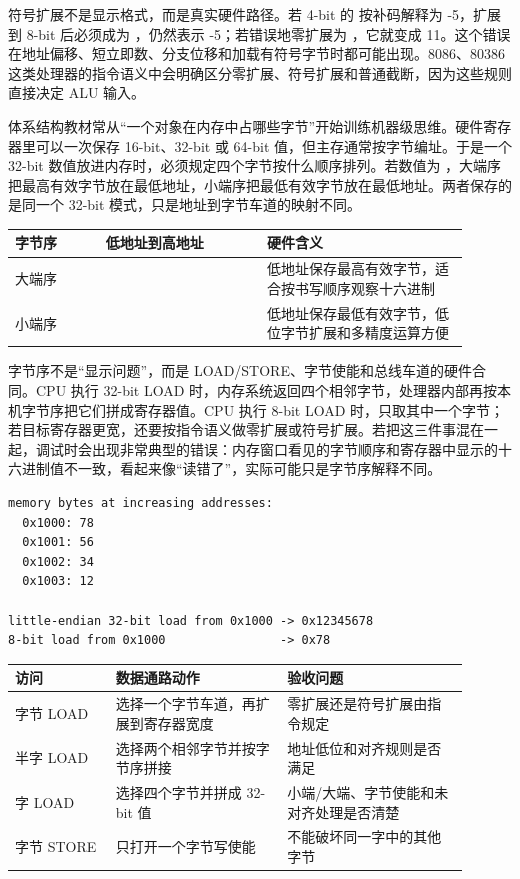 符号扩展不是显示格式，而是真实硬件路径。若 4-bit 的  按补码解释为 -5，扩展到 8-bit 后必须成为 ，仍然表示 -5；若错误地零扩展为 ，它就变成 11。这个错误在地址偏移、短立即数、分支位移和加载有符号字节时都可能出现。8086、80386 这类处理器的指令语义中会明确区分零扩展、符号扩展和普通截断，因为这些规则直接决定 ALU 输入。

体系结构教材常从“一个对象在内存中占哪些字节”开始训练机器级思维。硬件寄存器里可以一次保存 16-bit、32-bit 或 64-bit 值，但主存通常按字节编址。于是一个 32-bit 数值放进内存时，必须规定四个字节按什么顺序排列。若数值为 ，大端序把最高有效字节放在最低地址，小端序把最低有效字节放在最低地址。两者保存的是同一个 32-bit 模式，只是地址到字节车道的映射不同。

\begin{longtable}{L{0.18\linewidth}L{0.32\linewidth}L{0.4\linewidth}}
\toprule
字节序 & 低地址到高地址 & 硬件含义 \\
\midrule
大端序 &  & 低地址保存最高有效字节，适合按书写顺序观察十六进制 \\
小端序 &  & 低地址保存最低有效字节，低位字节扩展和多精度运算方便 \\
\bottomrule
\end{longtable}

字节序不是“显示问题”，而是 LOAD/STORE、字节使能和总线车道的硬件合同。CPU 执行 32-bit LOAD 时，内存系统返回四个相邻字节，处理器内部再按本机字节序把它们拼成寄存器值。CPU 执行 8-bit LOAD 时，只取其中一个字节；若目标寄存器更宽，还要按指令语义做零扩展或符号扩展。若把这三件事混在一起，调试时会出现非常典型的错误：内存窗口看见的字节顺序和寄存器中显示的十六进制值不一致，看起来像“读错了”，实际可能只是字节序解释不同。

\begin{lstlisting}
memory bytes at increasing addresses:
  0x1000: 78
  0x1001: 56
  0x1002: 34
  0x1003: 12

little-endian 32-bit load from 0x1000 -> 0x12345678
8-bit load from 0x1000                -> 0x78
\end{lstlisting}

\begin{longtable}{L{0.2\linewidth}L{0.34\linewidth}L{0.36\linewidth}}
\toprule
访问 & 数据通路动作 & 验收问题 \\
\midrule
字节 LOAD & 选择一个字节车道，再扩展到寄存器宽度 & 零扩展还是符号扩展由指令规定 \\
半字 LOAD & 选择两个相邻字节并按字节序拼接 & 地址低位和对齐规则是否满足 \\
字 LOAD & 选择四个字节并拼成 32-bit 值 & 小端/大端、字节使能和未对齐处理是否清楚 \\
字节 STORE & 只打开一个字节写使能 & 不能破坏同一字中的其他字节 \\
\bottomrule
\end{longtable}

